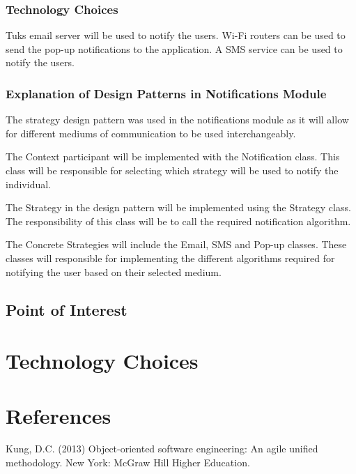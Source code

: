 \documentclass[runningheads,a4paper]{article}
\begin{document}
\subsubsection{Technology Choices}
Tuks email server will be used to notify the users.
Wi-Fi routers can be used to send the pop-up notifications to the application.
A SMS service can be used to notify the users.
\subsubsection{Explanation of Design Patterns in Notifications Module}
The strategy design pattern was used in the notifications module as it will allow for different mediums of communication to be used interchangeably.

The Context participant will be implemented with the Notification class. This class will be responsible for selecting which strategy will be used to notify the individual.

The Strategy in the design pattern will be implemented using the Strategy class. The responsibility of this class will be to call the required notification algorithm.

The Concrete Strategies will include the Email, SMS and Pop-up classes. These classes will responsible for implementing the different algorithms required for notifying the user based on their selected medium.


\subsection {Point of Interest}



\section{Technology Choices}



\section{References}

Kung, D.C. (2013) Object-oriented software engineering: An agile unified methodology. New York: McGraw Hill Higher Education.
\end{document}
